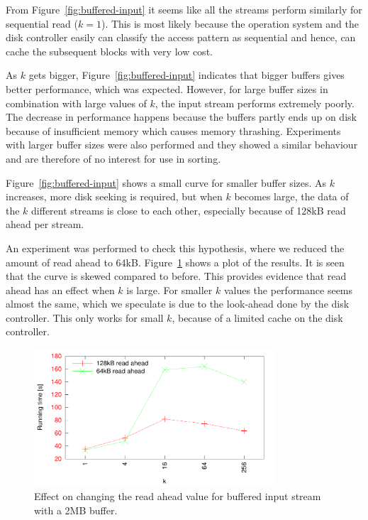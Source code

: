 \documentclass[a4paper,12pt]{article}
\begin{document}
From Figure~\ref{fig:buffered-input} it seems like all the streams
perform similarly for sequential read ($k = 1$). This is most likely because the operation system and the disk controller easily can classify the access pattern as sequential and hence, can cache the subsequent blocks with very low cost.

As $k$ gets bigger, Figure~\ref{fig:buffered-input} indicates that
bigger buffers gives better performance, which was expected. However,
for large buffer sizes in combination with large values of $k$, the
input stream performs extremely poorly. The decrease in performance happens because the
buffers partly ends up on disk because of insufficient memory which causes memory thrashing. Experiments with larger buffer sizes were also performed and they
showed a similar behaviour and are therefore of no
interest for use in sorting.


Figure~\ref{fig:buffered-input} shows a small curve for smaller buffer
sizes. As $k$ increases, more disk seeking is required, but when $k$
becomes large, the data of the $k$ different streams is close to each other,
especially because of 128kB read ahead per stream.

An experiment was performed to check this hypothesis, where we reduced the amount of read ahead to 64kB. Figure~\ref{fig:buffered-readahead} shows a plot of the
results. It is seen that the curve is skewed compared to before. This
provides evidence that read ahead has an effect when $k$ is large. For
smaller $k$ values the performance seems almost the same, which we
speculate is due to the look-ahead done by the disk controller. This
only works for small $k$, because of a limited cache on the disk
controller.

\begin{figure}
  \centering
  \includegraphics[width=0.8\textwidth]{buffered_input_rd}
  \caption{Effect on changing the read ahead value for buffered input
    stream with a 2MB buffer.}
  \label{fig:buffered-readahead}
\end{figure}
\end{document}
